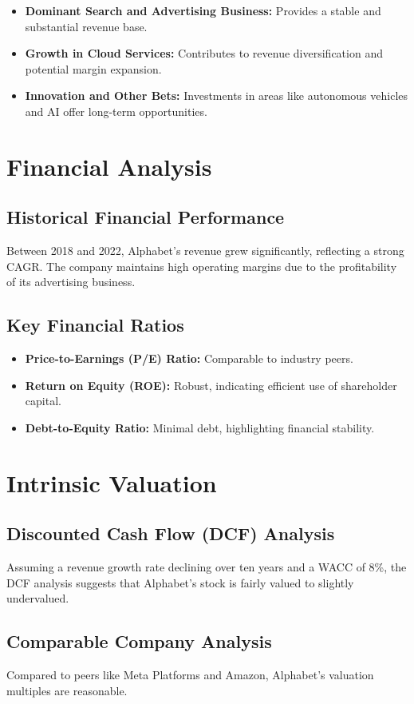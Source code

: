 \documentclass[12pt]{report}
\begin{document}
\begin{itemize}
    \item \textbf{Dominant Search and Advertising Business:} Provides a stable and substantial revenue base.
    \item \textbf{Growth in Cloud Services:} Contributes to revenue diversification and potential margin expansion.
    \item \textbf{Innovation and Other Bets:} Investments in areas like autonomous vehicles and AI offer long-term opportunities.
\end{itemize}

\section{Financial Analysis}
\subsection{Historical Financial Performance}
Between 2018 and 2022, Alphabet's revenue grew significantly, reflecting a strong CAGR. The company maintains high operating margins due to the profitability of its advertising business.

\subsection{Key Financial Ratios}
\begin{itemize}
    \item \textbf{Price-to-Earnings (P/E) Ratio:} Comparable to industry peers.
    \item \textbf{Return on Equity (ROE):} Robust, indicating efficient use of shareholder capital.
    \item \textbf{Debt-to-Equity Ratio:} Minimal debt, highlighting financial stability.
\end{itemize}

\section{Intrinsic Valuation}
\subsection{Discounted Cash Flow (DCF) Analysis}
Assuming a revenue growth rate declining over ten years and a WACC of 8\%, the DCF analysis suggests that Alphabet's stock is fairly valued to slightly undervalued.

\subsection{Comparable Company Analysis}
Compared to peers like Meta Platforms and Amazon, Alphabet's valuation multiples are reasonable.
\end{document}
